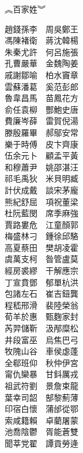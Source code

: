 \documentclass[a4paper]{article}
\begin{document}
\begin{multicols}{2}
\begin{Huge}
︽百家姓︾
\\[4mm]
\end{Huge}

\begin{huge}

趙錢孫李　周吳鄭王\\
馮陳褚衛　蔣沈韓楊\\
朱秦尤許　何呂施張\\
孔曹嚴華　金魏陶姜\\
戚謝鄒喻　柏水竇章\\
雲蘇潘葛　奚范彭郎\\
魯韋昌馬　苗鳳花方\\
俞任袁柳　酆鮑史唐\\
費廉岑薛　雷賀倪湯\\
滕殷羅畢　郝鄔安常\\
樂于時傅　皮卞齊康\\
伍余元卜　顧孟平黃\\
和穆蕭尹　姚邵湛汪\\
祁毛禹狄　米貝明臧\\
計伏成戴　談宋茅龐\\
熊紀舒屈　項祝董梁\\
杜阮藍閔　席季麻強\\
賈路婁危　江童顏郭\\
梅盛林刁　鍾徐邱駱\\
高夏蔡田　樊胡凌霍\\
虞萬支柯　昝管盧莫\\
經房裘繆　干解應宗\\
丁宣賁鄧　郁單杭洪\\
包諸左石　崔吉鈕龔\\
程嵇邢滑　裴陸榮翁\\
荀羊於惠　甄麴家封\\
芮羿儲靳　汲邴糜松\\
井段富巫　烏焦巴弓\\
牧隗山谷　車侯虙蓬\\
全郗班仰　秋仲伊宮\\
甯仇欒暴　甘鈄厲戎\\
祖武符劉　景詹束龍\\
葉幸司韶　郜黎薊薄\\
印宿白懷　蒲邰從鄂\\
索咸籍賴　卓藺屠蒙\\
池喬陰鬱　胥能蒼雙\\
聞莘党翟　譚貢勞逄\\

\end{huge}
\end{multicols}
\end{document}
